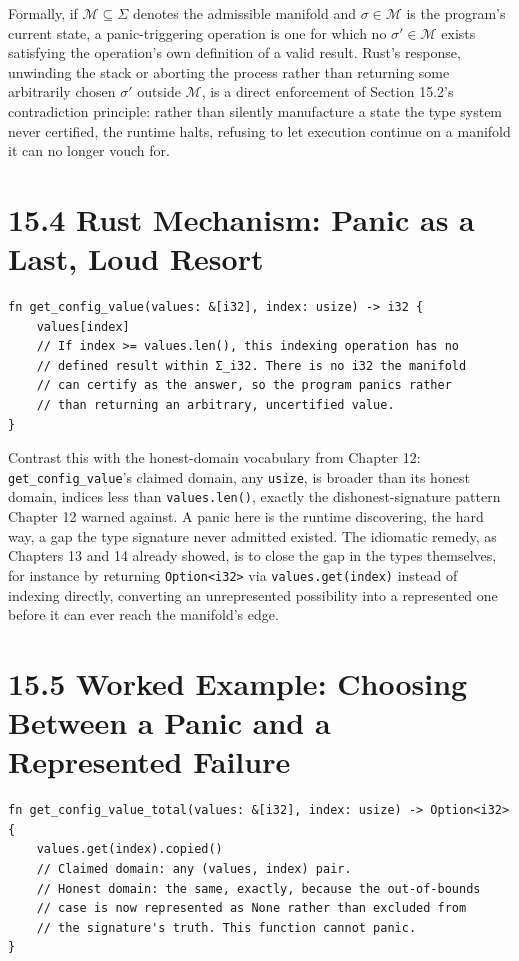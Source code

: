 \documentclass[11pt]{book}
\begin{document}
Formally, if $\mathcal{M} \subseteq \Sigma$ denotes the admissible manifold and $\sigma \in \mathcal{M}$ is the program's current state, a panic-triggering operation is one for which no $\sigma' \in \mathcal{M}$ exists satisfying the operation's own definition of a valid result. Rust's response, unwinding the stack or aborting the process rather than returning some arbitrarily chosen $\sigma'$ outside $\mathcal{M}$, is a direct enforcement of Section 15.2's contradiction principle: rather than silently manufacture a state the type system never certified, the runtime halts, refusing to let execution continue on a manifold it can no longer vouch for.

\section*{15.4 Rust Mechanism: Panic as a Last, Loud Resort}

\begin{lstlisting}
fn get_config_value(values: &[i32], index: usize) -> i32 {
    values[index]
    // If index >= values.len(), this indexing operation has no
    // defined result within Σ_i32. There is no i32 the manifold
    // can certify as the answer, so the program panics rather
    // than returning an arbitrary, uncertified value.
}
\end{lstlisting}

Contrast this with the honest-domain vocabulary from Chapter 12: \texttt{get\_config\_value}'s claimed domain, any \texttt{usize}, is broader than its honest domain, indices less than \texttt{values.len()}, exactly the dishonest-signature pattern Chapter 12 warned against. A panic here is the runtime discovering, the hard way, a gap the type signature never admitted existed. The idiomatic remedy, as Chapters 13 and 14 already showed, is to close the gap in the types themselves, for instance by returning \texttt{Option<i32>} via \texttt{values.get(index)} instead of indexing directly, converting an unrepresented possibility into a represented one before it can ever reach the manifold's edge.

\section*{15.5 Worked Example: Choosing Between a Panic and a Represented Failure}

\begin{lstlisting}
fn get_config_value_total(values: &[i32], index: usize) -> Option<i32> {
    values.get(index).copied()
    // Claimed domain: any (values, index) pair.
    // Honest domain: the same, exactly, because the out-of-bounds
    // case is now represented as None rather than excluded from
    // the signature's truth. This function cannot panic.
}
\end{lstlisting}
\end{document}
